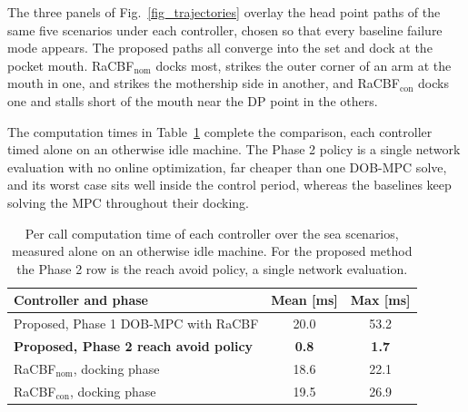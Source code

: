 \documentclass[5p,times,authoryear]{elsarticle}
\begin{document}
The three panels of Fig.~\ref{fig_trajectories} overlay the head point paths of the same five scenarios under each controller, chosen so that every baseline failure mode appears. The proposed paths all converge into the set and dock at the pocket mouth. RaCBF$_{\mathrm{nom}}$ docks most, strikes the outer corner of an arm at the mouth in one, and strikes the mothership side in another, and RaCBF$_{\mathrm{con}}$ docks one and stalls short of the mouth near the DP point in the others.

The computation times in Table~\ref{tab_compute} complete the comparison, each controller timed alone on an otherwise idle machine. The Phase 2 policy is a single network evaluation with no online optimization, far cheaper than one DOB-MPC solve, and its worst case sits well inside the control period, whereas the baselines keep solving the MPC throughout their docking.

\begin{table}[t]
  \centering
  \caption{Per call computation time of each controller over the sea scenarios, measured alone on an otherwise idle machine. For the proposed method the Phase 2 row is the reach avoid policy, a single network evaluation.}
  \label{tab_compute}
  \begin{tabular}{lcc}
    \hline
    Controller and phase & Mean [ms] & Max [ms] \\
    \hline
    Proposed, Phase 1 DOB-MPC with RaCBF & 20.0 & 53.2 \\
    \textbf{Proposed, Phase 2 reach avoid policy} & \textbf{0.8} & \textbf{1.7} \\
    RaCBF$_{\mathrm{nom}}$, docking phase & 18.6 & 22.1 \\
    RaCBF$_{\mathrm{con}}$, docking phase & 19.5 & 26.9 \\
    \hline
  \end{tabular}
\end{table}
\end{document}
